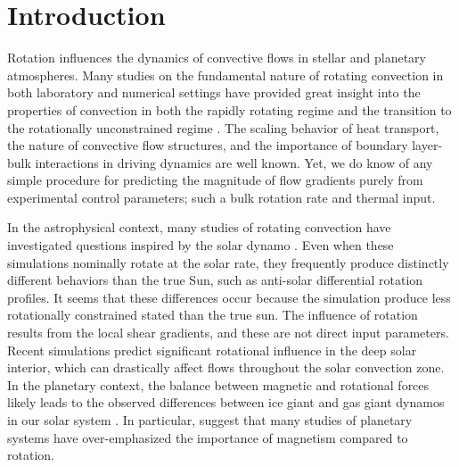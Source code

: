 \documentclass[twocolumn, amsmath, amsfonts, amssymb]{aastex62}
\newcommand{\gv}[1]{{\color{blue} #1}}
\begin{document}
\section{Introduction}
\label{sec:intro}
Rotation influences the dynamics of convective flows in
stellar and planetary atmospheres.
Many studies on the fundamental nature of
rotating convection in both laboratory and numerical settings
have provided great insight into the properties of convection 
in both the rapidly rotating regime 
\citep{julien&all2012, stellmach&all2014, gastine&all2016}
and the \gv{transition to the} rotationally unconstrained regime \citep{king&all2009, zhong&all2009, 
cheng&all2015}. 
The scaling behavior of heat transport, the nature of convective flow
structures, and the importance of boundary layer-bulk interactions in driving dynamics are well known.
\gv{Yet, we do know of any simple procedure for predicting the magnitude of flow gradients purely from experimental control parameters; such a bulk rotation rate and thermal input.}

In the astrophysical context,
many studies of rotating convection have investigated questions inspired by the solar dynamo
\citep{glatzmaier&gilman1982, busse2002, brown&all2008,
brown&all2010, brown&all2011, augustson&all2012, guerrero&all2013, kapyla&all2014}.
Even when these simulations nominally rotate at the solar rate,
they frequently produce distinctly different behaviors than the true Sun,
such as anti-solar differential rotation profiles.
\gv{It seems that these differences occur because the simulation produce less rotationally constrained stated than the true sun. The influence of rotation results from the local shear gradients, and these are not direct input parameters.}
Recent simulations predict significant rotational influence in the deep solar interior, which can drastically affect flows throughout the solar convection zone\citep{featherstone&hindman2016, greer&all2016}. 
In the planetary context, the balance between magnetic
and rotational forces likely leads to the observed differences between ice
giant and gas giant dynamos in our solar system \citep{soderlund&all2015}.
In particular, \cite{aurnou&king2017} suggest that many studies of planetary systems
have over-emphasized the importance of magnetism compared to rotation.
\end{document}
